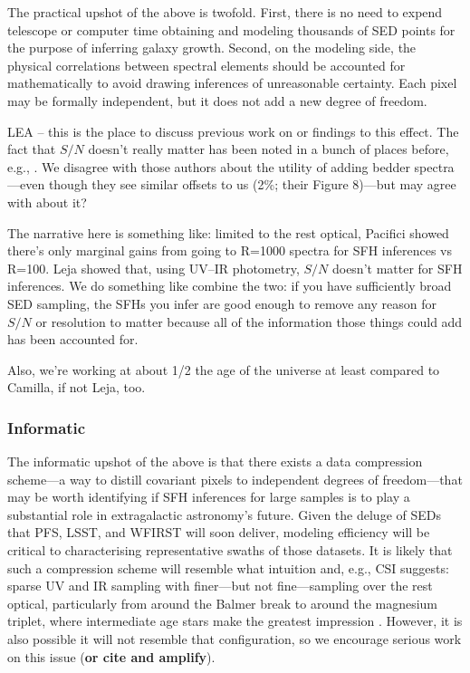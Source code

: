 \documentclass[a4paper,fleqn,usenatbib]{mnras}
\newcommand{\bfr}{\bf\color{red}}
\newcommand{\bfb}{\color{myblue}}
\begin{document}
The practical upshot of the above is twofold. First, there is no need to expend telescope
or computer time obtaining and modeling thousands of SED points for the purpose of inferring 
galaxy growth. Second, on the modeling side, the physical correlations between spectral
elements should be accounted for mathematically to avoid drawing inferences of unreasonable 
certainty. Each pixel may be formally independent, but it does not add a new degree of freedom.
{\bfb LEA -- this is the place to discuss previous work on or findings to this effect. The fact
that $S/N$ doesn't really matter has been noted in a bunch of places before, e.g., \citet{Leja19}.
We disagree with those authors about the utility of adding bedder spectra---even though they
see similar offsets to us (2\%; their Figure 8)---but may agree with \citet{Ocvirk06} about it?

The narrative here is something like: limited to the rest optical, Pacifici showed there's only
marginal gains from going to R=1000 spectra for SFH inferences vs R=100. Leja showed that, 
using UV--IR photometry, $S/N$ doesn't matter for SFH inferences. We do something like
combine the two: if you have sufficiently broad SED sampling, the SFHs you infer are good enough
to remove any reason for $S/N$ or resolution to matter because all of the information those
things could add has been accounted for.

Also, we're working at about 1/2 the age of the universe at least compared to Camilla, if not
Leja, too.}

\subsubsection{Informatic}

The informatic upshot of the above is that there exists a data compression scheme---a way to
distill covariant pixels to independent degrees of freedom---that may be
worth identifying if SFH inferences for large samples is to play a substantial role in extragalactic 
astronomy's future. Given the deluge of SEDs that PFS, LSST, and WFIRST will soon deliver, 
modeling efficiency will be critical to characterising representative swaths of those datasets. 
It is likely that such a compression scheme will resemble what intuition
and, e.g., CSI suggests: sparse UV and IR sampling with finer---but not fine---sampling over
the rest optical, particularly from around the Balmer break to around the magnesium triplet,
where intermediate age stars make the greatest impression \citep[e.g.,][]{Dressler16}. However,
it is also possible it will not resemble that configuration, so we encourage serious work on this 
issue ({\bfr or cite and amplify}).
\end{document}
